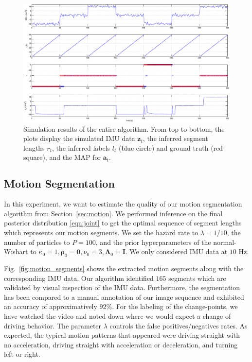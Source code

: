 \begin{figure}[t]
\centering
\includegraphics[width=\columnwidth]{fig/simResult.eps}
\caption{Simulation results of the entire algorithm. From top to bottom, the
plots display the simulated IMU data $\mathbf{z}_t$, the inferred segment
lengths $r_t$, the inferred labels $l_t$ (blue circle) and ground truth
(red square), and the MAP for $\mathbf{a}_t$.}
\label{fig:simulation}
\end{figure}

\subsection{Motion Segmentation}
In this experiment, we want to estimate the quality of our motion segmentation
algorithm from Section~\ref{sec:motion}. We performed inference on the
final posterior distribution \eqref{eqn:joint} to get the optimal
sequence of segment lengths which represents our motion segments. We set the
hazard rate to $\lambda=1/10$, the number of particles to $P=100$, and the prior
hyperparameters of the normal-Wishart to $\kappa_0=1,
\boldsymbol{\rho}_0=\mathbf{0},\nu_0=3,\boldsymbol{\Lambda}_0=\mathbf{I}$. We
only considered IMU data at $10$ Hz.

Fig.~\ref{fig:motion_segments} shows the extracted motion segments along with
the corresponding IMU data. Our algorithm identified $165$ segments which are
validated by visual inspection of the IMU data. Furthermore, the segmentation
has been compared to a manual annotation of our image sequence and exhibited an
accuracy of approximatively $92\%$. For the labeling of the change-points, we
have watched the video and noted down where we would expect a change of driving
behavior. The parameter $\lambda$ controls the false positives/negatives rates.
As expected, the typical motion patterns that appeared were driving straight
with no acceleration, driving straight with acceleration or deceleration, and
turning left or right.


